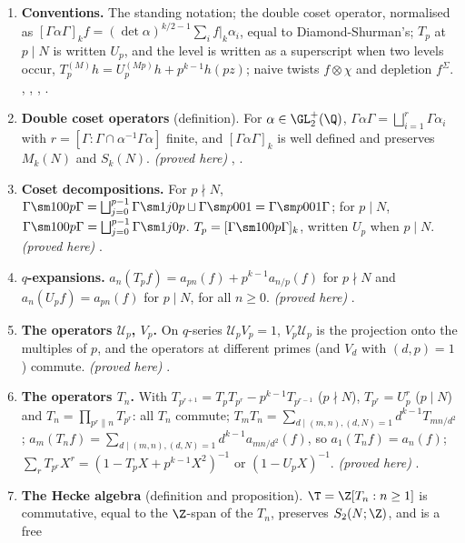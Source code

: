 \begin{enumerate}[label=\textbf{\thechapter.\arabic*}]
\item \textbf{Conventions.} The standing notation; the double coset operator, normalised as
$[\Gamma\alpha\Gamma]_kf=(\det\alpha)^{k/2-1}\sum_if|_k\alpha_i$, equal to Diamond-Shurman's; $T_p$ at $p\mid N$ is written $U_p$, and the level is written as a superscript when two levels occur, $T_p^{(M)}h=U_p^{(Mp)}h+p^{k-1}h(pz)$; naive twists $f\otimes\chi$ and depletion
$f^\Sigma$. , , , .
\item \textbf{Double coset operators} (definition). For $\alpha\in\GL_2^+(\Q)$, $\Gamma\alpha\Gamma=\bigsqcup_{i=1}^r\Gamma\alpha_i$ with $r=[\Gamma:\Gamma\cap\alpha^{-1}\Gamma\alpha]$ finite, and
$[\Gamma\alpha\Gamma]_k$ is well defined and preserves $M_k(N)$ and $S_k(N)$. \emph{(proved here)} , .
\item \textbf{Coset decompositions.} For $p\nmid N$, $\Gamma\sm100p\Gamma=\bigsqcup_{j=0}^{p-1}\Gamma\sm1j0p\sqcup\Gamma\sm p001=\Gamma\sm p001\Gamma$; for $p\mid N$,
$\Gamma\sm100p\Gamma=\bigsqcup_{j=0}^{p-1}\Gamma\sm1j0p$. $T_p=[\Gamma\sm100p\Gamma]_k$, written $U_p$ when $p\mid N$. \emph{(proved here)} .
\item \textbf{$q$-expansions.} $a_n(T_pf)=a_{pn}(f)+p^{k-1}a_{n/p}(f)$ for $p\nmid N$ and $a_n(U_pf)=a_{pn}(f)$ for $p\mid N$, for all $n\ge0$. \emph{(proved here)}
.
\item \textbf{The operators $\mathcal U_p$, $V_p$.} On $q$-series $\mathcal U_pV_p=1$, $V_p\mathcal U_p$ is the projection onto the multiples of $p$, and the operators at different primes (and $V_d$ with
$(d,p)=1$) commute. \emph{(proved here)} .
\item \textbf{The operators $T_n$.} With $T_{p^{r+1}}=T_pT_{p^r}-p^{k-1}T_{p^{r-1}}$ ($p\nmid N$), $T_{p^r}=U_p^r$ ($p\mid N$) and $T_n=\prod_{p^r\|n}T_{p^r}$: all $T_n$ commute;
$T_mT_n=\sum_{d\mid(m,n),(d,N)=1}d^{k-1}T_{mn/d^2}$; $a_m(T_nf)=\sum_{d\mid(m,n),(d,N)=1}d^{k-1}a_{mn/d^2}(f)$, so $a_1(T_nf)=a_n(f)$; $\sum_rT_{p^r}X^r=(1-T_pX+p^{k-1}X^2)^{-1}$
or $(1-U_pX)^{-1}$. \emph{(proved here)} .
\item \textbf{The Hecke algebra} (definition and proposition). $\T=\Z[T_n:n\ge1]$ is commutative, equal to the $\Z$-span of the $T_n$, preserves $S_2(N;\Z)$, and is a free

\end{enumerate}
